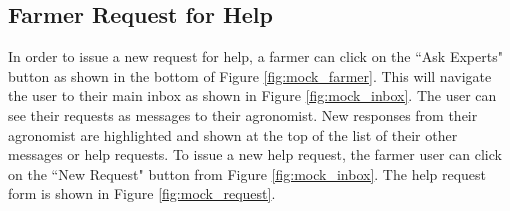 \subsection{Farmer Request for Help}
\noindent
In order to issue a new request for help, a farmer can click on the “Ask Experts" button as shown in the bottom of Figure \ref{fig:mock_farmer}. This will navigate the user to their main inbox as shown in Figure \ref{fig:mock_inbox}. The user can see their requests as messages to their agronomist. New responses from their agronomist are highlighted and shown at the top of the list of their other messages or help requests. To issue a new help request, the farmer user can click on the “New Request" button from Figure \ref{fig:mock_inbox}. The help request form is shown in Figure \ref{fig:mock_request}.

\begin{multicols}{2}
\begin{figure}[H]
\centering

\end{figure}
\end{multicols}
